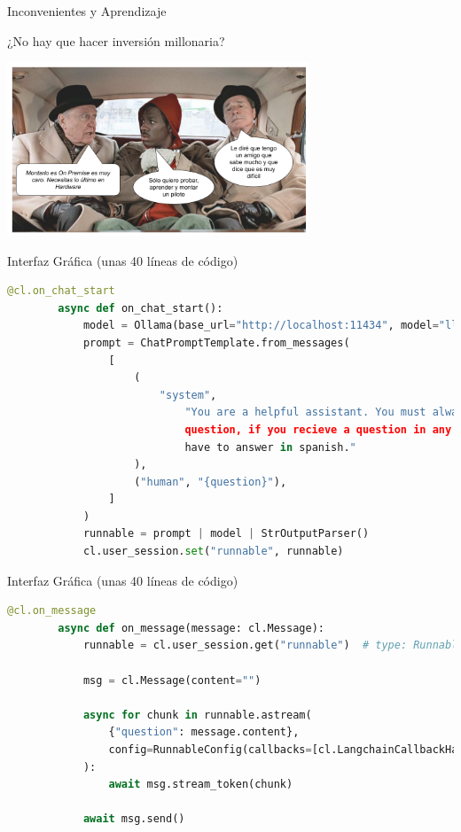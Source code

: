 \documentclass[table, unknownkeysallowed, 10pt]{beamer}
\begin{document}
\begin{frame}{Inconvenientes y Aprendizaje}
    \begin{block}{¿No hay que hacer inversión millonaria?}
    \begin{center}
        \includegraphics[width=9cm]{imagenes/murphy.png}
    \end{center}
\end{block}

\end{frame}

\begin{frame}[fragile]{Interfaz Gráfica (unas 40 líneas de código)}

    \begin{lstlisting}[language=Python, caption=Código usando el framework Chainlit]
        @cl.on_chat_start
        async def on_chat_start():
            model = Ollama(base_url="http://localhost:11434", model="llama3")
            prompt = ChatPromptTemplate.from_messages(
                [
                    (
                        "system",
                            "You are a helpful assistant. You must always make responses to spanish
                            question, if you recieve a question in any other language. Moreover, you
                            have to answer in spanish."
                    ),
                    ("human", "{question}"),
                ]
            )
            runnable = prompt | model | StrOutputParser()
            cl.user_session.set("runnable", runnable)
    \end{lstlisting}
\end{frame}

\begin{frame}[fragile]{Interfaz Gráfica (unas 40 líneas de código)}
    \begin{lstlisting}[language=Python, caption=Código usando el framework Chainlit]
        @cl.on_message
        async def on_message(message: cl.Message):
            runnable = cl.user_session.get("runnable")  # type: Runnable
        
            msg = cl.Message(content="")
        
            async for chunk in runnable.astream(
                {"question": message.content},
                config=RunnableConfig(callbacks=[cl.LangchainCallbackHandler()]),
            ):
                await msg.stream_token(chunk)
        
            await msg.send()
    \end{lstlisting}
\end{frame}
\end{document}
